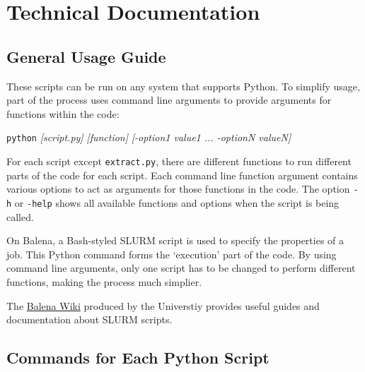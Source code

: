 \section{Technical Documentation} \label{sec:appx-doc}
\subsection{General Usage Guide}
These scripts can be run on any system that supports Python. To simplify usage, part of the process uses command line arguments to provide arguments for functions within the code:

\centerline{\texttt{python} \textit{[script.py]} \textit{[function]} \textit{[-option1 value1 ... -optionN valueN]}} 

For each script except \texttt{extract.py}, there are different functions to run different parts of the code for each script. Each command line function argument contains various options to act as arguments for those functions in the code. The option \texttt{-h} or \texttt{-help} shows all available functions and options when the script is being called.

On Balena, a Bash-styled SLURM script is used to specify the properties of a job. This Python command forms the `execution' part of the code. By using command line arguments, only one script has to be changed to perform different functions, making the process much simplier. 

The \href{https://wiki.bath.ac.uk/display/BalenaHPC/Balena+High+Performance+Computing+Service}{Balena Wiki} produced by the Universtiy provides useful guides and documentation about SLURM scripts.


\subsection{Commands for Each Python Script}

